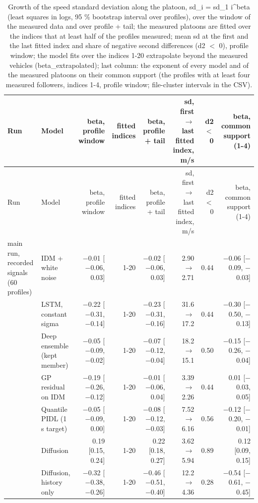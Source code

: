 \begin{longtable}{llrrrrrr}
\caption{Growth of the speed standard deviation along the platoon, sd\_i = sd\_1 i\textasciicircum{}beta (least squares in logs, 95 \% bootstrap interval over profiles), over the window of the measured data and over profile + tail; the measured platoons are fitted over the indices that at least half of the profiles measured; mean sd at the first and the last fitted index and share of negative second differences (d2 $<$ 0), profile window; the model fits over the indices 1-20 extrapolate beyond the measured vehicles (beta\_extrapolated); last column: the exponent of every model and of the measured platoons on their common support (the profiles with at least four measured followers, indices 1-4, profile window; file-cluster intervals in the CSV).}\label{tab:t6-growth} \\
\toprule
Run & Model & beta, profile window & fitted indices & beta, profile + tail & sd, first $\rightarrow$ last fitted index, m/s & d2 $<$ 0 & beta, common support (1-4) \\
\midrule
\endfirsthead
\toprule
Run & Model & beta, profile window & fitted indices & beta, profile + tail & sd, first $\rightarrow$ last fitted index, m/s & d2 $<$ 0 & beta, common support (1-4) \\
\midrule
\endhead
\bottomrule
\endlastfoot
main run, recorded signals (60 profiles) & IDM + white noise & $-$0.01 [$-$0.06, 0.03] & 1-20 & $-$0.02 [$-$0.06, 0.03] & 2.90 $\rightarrow$ 2.71 & 0.44 & $-$0.06 [$-$0.09, $-$0.03] \\
 & LSTM, constant sigma & $-$0.22 [$-$0.31, $-$0.14] & 1-20 & $-$0.23 [$-$0.31, $-$0.16] & 31.6 $\rightarrow$ 17.2 & 0.44 & $-$0.30 [$-$0.50, $-$0.13] \\
 & Deep ensemble (kept member) & $-$0.05 [$-$0.09, $-$0.02] & 1-20 & $-$0.07 [$-$0.12, $-$0.04] & 18.2 $\rightarrow$ 15.1 & 0.50 & $-$0.15 [$-$0.26, $-$0.04] \\
 & GP residual on IDM & $-$0.19 [$-$0.26, $-$0.12] & 1-20 & $-$0.01 [$-$0.06, 0.04] & 3.39 $\rightarrow$ 2.26 & 0.44 & 0.01 [$-$0.03, 0.05] \\
 & Quantile PIDL (1 s target) & $-$0.05 [$-$0.09, 0.00] & 1-20 & $-$0.08 [$-$0.12, $-$0.03] & 7.52 $\rightarrow$ 6.16 & 0.56 & $-$0.12 [$-$0.20, $-$0.01] \\
 & Diffusion & 0.19 [0.15, 0.24] & 1-20 & 0.22 [0.18, 0.27] & 3.62 $\rightarrow$ 5.94 & 0.89 & 0.12 [0.09, 0.15] \\
 & Diffusion, history only & $-$0.32 [$-$0.38, $-$0.26] & 1-20 & $-$0.46 [$-$0.51, $-$0.40] & 12.2 $\rightarrow$ 4.36 & 0.28 & $-$0.54 [$-$0.61, $-$0.45] \\

\end{longtable}
